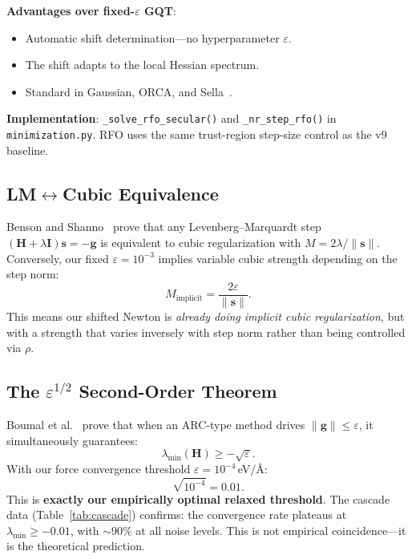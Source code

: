 \documentclass[11pt,a4paper]{article}
\newcommand{\vect}[1]{\bm{#1}}
\newcommand{\mat}[1]{\mathbf{#1}}
\newcommand{\norm}[1]{\lVert #1 \rVert}
\theoremstyle{definition}
\begin{document}
\textbf{Advantages over fixed-$\varepsilon$ GQT}:
\begin{itemize}[nosep]
  \item Automatic shift determination---no hyperparameter $\varepsilon$.
  \item The shift adapts to the local Hessian spectrum.
  \item Standard in Gaussian, ORCA, and Sella~\citep{sella}.
\end{itemize}

\textbf{Implementation}: \texttt{\_solve\_rfo\_secular()} and
\texttt{\_nr\_step\_rfo()} in \texttt{minimization.py}.  RFO uses the same
trust-region step-size control as the v9 baseline.

\subsection{LM$\leftrightarrow$Cubic Equivalence}
\label{sec:lm-cubic}

Benson and Shanno~\citep{benson-shanno} prove that any
Levenberg--Marquardt step $(\mat{H}+\lambda\mat{I})\vect{s}=-\vect{g}$ is
equivalent to cubic regularization with $M = 2\lambda/\norm{\vect{s}}$.
Conversely, our fixed $\varepsilon = 10^{-3}$ implies variable cubic
strength depending on the step norm:
\begin{equation}
  M_\text{implicit} = \frac{2\varepsilon}{\norm{\vect{s}}}.
\end{equation}
This means our shifted Newton is \emph{already doing implicit cubic
regularization}, but with a strength that varies inversely with step norm
rather than being controlled via $\rho$.

\subsection{The $\varepsilon^{1/2}$ Second-Order Theorem}
\label{sec:eps-half}

Boumal et al.~\citep{boumal-arc-manifolds} prove that when an ARC-type
method drives $\norm{\vect{g}} \leq \varepsilon$, it simultaneously
guarantees:
\begin{equation}
  \lambda_\text{min}(\mat{H}) \geq -\sqrt{\varepsilon}.
  \label{eq:eps-half}
\end{equation}
With our force convergence threshold $\varepsilon = 10^{-4}$\,eV/\AA:
\begin{equation}
  \sqrt{10^{-4}} = 0.01.
\end{equation}
This is \textbf{exactly our empirically optimal relaxed threshold}.
The cascade data (Table~\ref{tab:cascade}) confirms: the convergence rate
plateaus at $\lambda_\text{min} \geq -0.01$, with $\sim$90\% at all noise
levels.  This is not empirical coincidence---it is the theoretical prediction.
\end{document}
